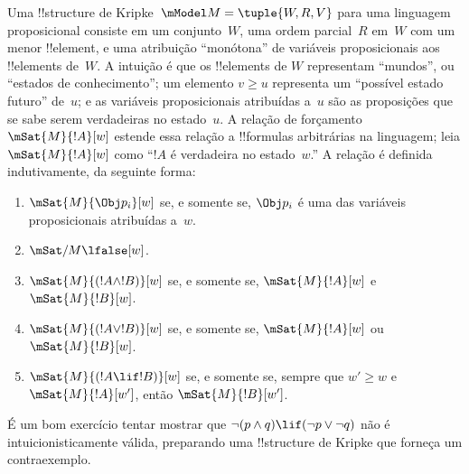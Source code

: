 \documentclass[../../../include/open-logic-section]{subfiles}
\begin{document}
Uma !!{structure} de Kripke~$\mModel M = \tuple{W, R, V}$ para uma
linguagem proposicional consiste em um conjunto~$W$, uma ordem parcial~$R$
em~$W$ com um menor !!{element}, e uma atribuição ``monótona'' de
variáveis proposicionais aos !!{element}s de~$W$. A intuição é que os
!!{element}s de $W$ representam ``mundos'', ou ``estados de conhecimento'';
um elemento $v \geq u$ representa um ``possível estado futuro'' de~$u$; e
as variáveis proposicionais atribuídas a~$u$ são as proposições que se
sabe serem verdadeiras no estado~$u$. A relação de forçamento
$\mSat{M}{!A}[w]$ estende essa relação a !!{formula}s arbitrárias na
linguagem; leia $\mSat{M}{!A}[w]$ como ``$!A$ é verdadeira no
estado~$w$.'' A relação é definida indutivamente, da seguinte forma:
\begin{enumerate}
\item $\mSat{M}{\Obj p_i}[w]$ se, e somente se, $\Obj p_i$ é uma das
  variáveis proposicionais atribuídas a~$w$.
\item $\mSat/{M}{\lfalse}[w]$.
\item $\mSat{M}{(!A \land !B)}[w]$ se, e somente se, $\mSat{M}{!A}[w]$ e $\mSat{M}{!B}[w]$.
\item $\mSat{M}{(!A \lor !B)}[w]$ se, e somente se, $\mSat{M}{!A}[w]$ ou $\mSat{M}{!B}[w]$.
\item $\mSat{M}{(!A \lif !B)}[w]$ se, e somente se, sempre que $w' \geq w$ e
  $\mSat{M}{!A}[w']$, então $\mSat{M}{!B}[w']$.
\end{enumerate}
É um bom exercício tentar mostrar que $\lnot (p \land q) \lif
(\lnot p \lor \lnot q)$ não é intuicionisticamente válida, preparando uma
!!{structure} de Kripke que forneça um contraexemplo.
\end{document}
